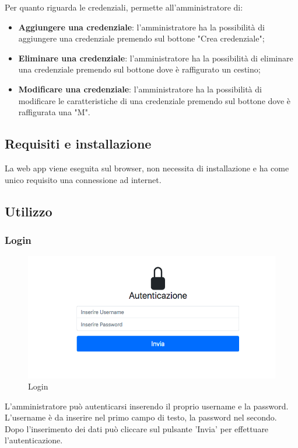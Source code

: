 Per quanto riguarda le credenziali, permette all'amministratore di:
\begin{itemize}
	\item \textbf{Aggiungere una credenziale}: l'amministratore ha la possibilità di aggiungere una credenziale premendo sul bottone "Crea credenziale"; \\
	\item \textbf{Eliminare una credenziale}: l'amministratore ha la possibilità di eliminare una credenziale premendo sul bottone dove è raffigurato un cestino; \\
	\item \textbf{Modificare una credenziale}:  l'amministratore ha la possibilità di modificare le caratteristiche di una credenziale premendo sul bottone dove è raffigurata una "M". \\
\end{itemize}

\subsection{Requisiti e installazione}
La web app viene eseguita sul browser, non necessita di installazione e ha come unico requisito una connessione ad internet.

\subsection{Utilizzo}
\subsubsection{Login}
\begin{figure}[H]
	\centering
	\includegraphics[width=15cm]{res/images/login.jpg}
	\caption{Login}
\end{figure}
L'amministratore può autenticarsi inserendo il proprio username e la password. L’username è da inserire nel primo campo di testo, la password nel secondo. Dopo l’inserimento dei dati può cliccare sul pulsante 'Invia' per effettuare l'autenticazione.

